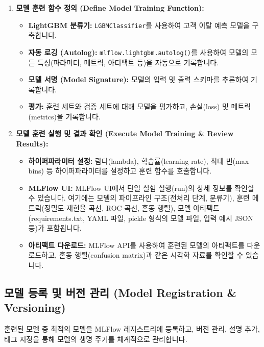 \documentclass[11pt,a4paper]{article}
\theoremstyle{definition}
\begin{document}
\begin{enumerate}
    \item \textbf{모델 훈련 함수 정의 (Define Model Training Function):}
    \begin{itemize}
        \item \textbf{LightGBM 분류기:} \texttt{LGBMClassifier}를 사용하여 고객 이탈 예측 모델을 구축합니다.
        \item \textbf{자동 로깅 (Autolog):} \texttt{mlflow.lightgbm.autolog()}를 사용하여 모델의 모든 특성(파라미터, 메트릭, 아티팩트 등)을 자동으로 기록합니다.
        \item \textbf{모델 서명 (Model Signature):} 모델의 입력 및 출력 스키마를 추론하여 기록합니다.
        \item \textbf{평가:} 훈련 세트와 검증 세트에 대해 모델을 평가하고, 손실(loss) 및 메트릭(metrics)을 기록합니다.
    \end{itemize}

    \item \textbf{모델 훈련 실행 및 결과 확인 (Execute Model Training & Review Results):}
    \begin{itemize}
        \item \textbf{하이퍼파라미터 설정:} 람다(lambda), 학습률(learning rate), 최대 빈(max bins) 등 하이퍼파라미터를 설정하고 훈련 함수를 호출합니다.
        \item \textbf{MLFlow UI:} MLFlow UI에서 단일 실험 실행(run)의 상세 정보를 확인할 수 있습니다. 여기에는 모델의 파이프라인 구조(전처리 단계, 분류기), 훈련 메트릭(정밀도-재현율 곡선, ROC 곡선, 혼동 행렬), 모델 아티팩트(requirements.txt, YAML 파일, pickle 형식의 모델 파일, 입력 예시 JSON 등)가 포함됩니다.
        \item \textbf{아티팩트 다운로드:} MLFlow API를 사용하여 훈련된 모델의 아티팩트를 다운로드하고, 혼동 행렬(confusion matrix)과 같은 시각화 자료를 확인할 수 있습니다.
    \end{itemize}
\end{enumerate}

\subsection{모델 등록 및 버전 관리 (Model Registration \& Versioning)}

\begin{summarybox}
훈련된 모델 중 최적의 모델을 MLFlow 레지스트리에 등록하고, 버전 관리, 설명 추가, 태그 지정을 통해 모델의 생명 주기를 체계적으로 관리합니다.
\end{summarybox}
\end{document}
